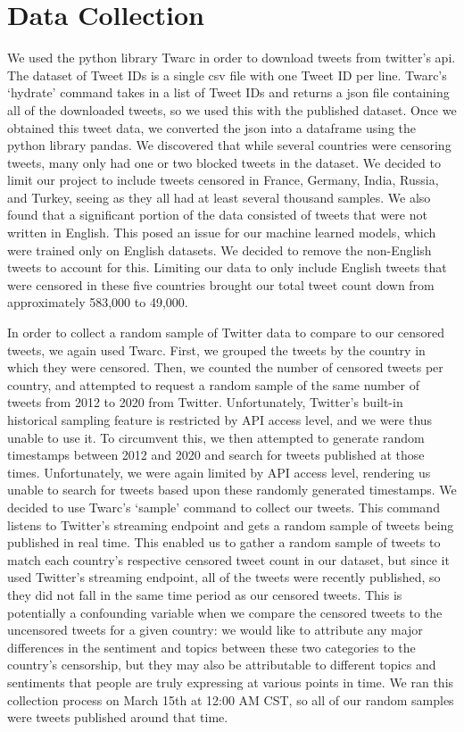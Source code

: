 \section{Data Collection}\label{sec:datacollection}
We used the python library Twarc in order to download tweets from twitter's api. The dataset \cite{DBLP:journals/corr/abs-2101-05919} of Tweet IDs is a single csv file with one Tweet ID per line. Twarc's ‘hydrate’ command takes in a list of Tweet IDs and returns a json file containing all of the downloaded tweets, so we used this with the published dataset. Once we obtained this tweet data, we converted the json into a dataframe using the python library pandas. We discovered that while several countries were censoring tweets, many only had one or two blocked tweets in the dataset. We decided to limit our project to include tweets censored in France, Germany, India, Russia, and Turkey, seeing as they all had at least several thousand samples. We also found that a significant portion of the data consisted of tweets that were not written in English. This posed an issue for our machine learned models, which were trained only on English datasets. We decided to remove the non-English tweets to account for this. Limiting our data to only include English tweets that were censored in these five countries brought our total tweet count down from approximately 583,000 to 49,000.

\par

In order to collect a random sample of Twitter data to compare to our censored tweets, we again used Twarc. First, we grouped the tweets by the country in which they were censored. Then, we counted the number of censored tweets per country, and attempted to request a random sample of the same number of tweets from 2012 to 2020 from Twitter. Unfortunately, Twitter's built-in historical sampling feature is restricted by API access level, and we were thus unable to use it. To circumvent this, we then attempted to generate random timestamps between 2012 and 2020 and search for tweets published at those times. Unfortunately, we were again limited by API access level, rendering us unable to search for tweets based upon these randomly generated timestamps. We decided to use Twarc's ‘sample’ command to collect our tweets. This command listens to Twitter's streaming endpoint and gets a random sample of tweets being published in real time. This enabled us to gather a random sample of tweets to match each country’s respective censored tweet count in our dataset, but since it used Twitter's streaming endpoint, all of the tweets were recently published, so they did not fall in the same time period as our censored tweets. This is potentially a confounding variable when we compare the censored tweets to the uncensored tweets for a given country: we would like to attribute any major differences in the sentiment and topics between these two categories to the country’s censorship, but they may also be attributable to different topics and sentiments that people are truly expressing at various points in time. We ran this collection process on March 15th at 12:00 AM CST, so all of our random samples were tweets published around that time.

